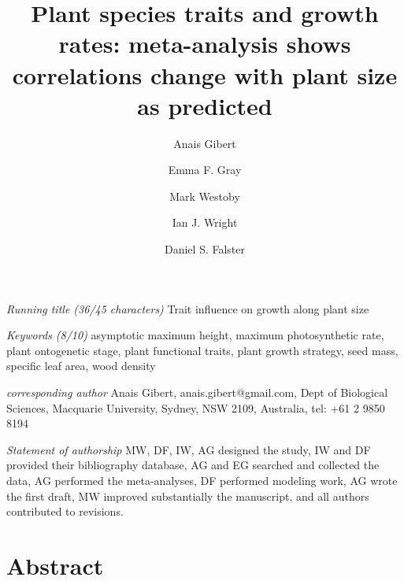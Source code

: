 \documentclass[a4paper]{article}\usepackage[]{graphicx}\usepackage[]{color}
\begin{document}
\clearpage

\title{Plant species traits and growth rates: meta-analysis shows correlations change with plant size as predicted}

\author[1]{Anais Gibert}
\author[1]{Emma F. Gray}
\author[1]{Mark Westoby}
\author[1]{Ian J. Wright}
\author[1]{Daniel S. Falster}




\maketitle

\textit{Running title (36/45 characters)} Trait influence on growth along plant size

\textit{Keywords (8/10)} asymptotic maximum height, maximum photosynthetic rate, plant ontogenetic stage, plant functional traits, plant growth strategy, seed mass, specific leaf area, wood density 

\textit{corresponding author} Anais Gibert, anais.gibert@gmail.com, Dept of Biological Sciences, Macquarie University, Sydney, NSW 2109, Australia, tel: +61 2 9850 8194

\textit{Statement of authorship} MW, DF, IW, AG designed the study, IW and DF provided their bibliography database, AG and EG searched and collected the data, AG performed the meta-analyses, DF performed modeling work, AG wrote the first draft, MW improved substantially the manuscript, and all authors contributed to revisions.



\clearpage

\section*{Abstract}\label{abstract}
\end{document}
